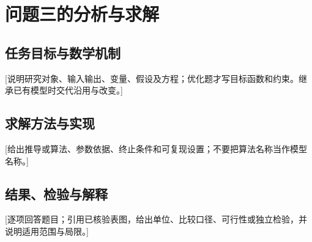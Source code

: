 \section{问题三的分析与求解}
\subsection{任务目标与数学机制}
[说明研究对象、输入输出、变量、假设及方程；优化题才写目标函数和约束。继承已有模型时交代沿用与改变。]
\subsection{求解方法与实现}
[给出推导或算法、参数依据、终止条件和可复现设置；不要把算法名称当作模型名称。]
\subsection{结果、检验与解释}
[逐项回答题目；引用已核验表图，给出单位、比较口径、可行性或独立检验，并说明适用范围与局限。]
